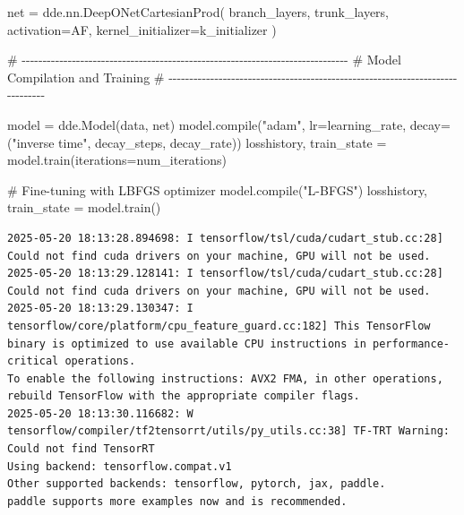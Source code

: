 \documentclass[
  spanish,
  us-letterpaper,
  DIV=11,
  numbers=noendperiod]{scrreprt}
\newenvironment{Shaded}{\begin{snugshade}}{\end{snugshade}}
\newcommand{\BuiltInTok}[1]{\textcolor[rgb]{0.00,0.23,0.31}{#1}}
\newcommand{\CommentTok}[1]{\textcolor[rgb]{0.37,0.37,0.37}{#1}}
\newcommand{\NormalTok}[1]{\textcolor[rgb]{0.00,0.23,0.31}{#1}}
\newcommand{\OperatorTok}[1]{\textcolor[rgb]{0.37,0.37,0.37}{#1}}
\newcommand{\StringTok}[1]{\textcolor[rgb]{0.13,0.47,0.30}{#1}}
\begin{document}
\begin{Shaded}
\begin{Highlighting}[]
\NormalTok{net }\OperatorTok{=}\NormalTok{ dde.nn.DeepONetCartesianProd(}
\NormalTok{    branch\_layers,}
\NormalTok{    trunk\_layers,}
\NormalTok{    activation}\OperatorTok{=}\NormalTok{AF,}
\NormalTok{    kernel\_initializer}\OperatorTok{=}\NormalTok{k\_initializer}
\NormalTok{)}

\CommentTok{\# {-}{-}{-}{-}{-}{-}{-}{-}{-}{-}{-}{-}{-}{-}{-}{-}{-}{-}{-}{-}{-}{-}{-}{-}{-}{-}{-}{-}{-}{-}{-}{-}{-}{-}{-}{-}{-}{-}{-}{-}{-}{-}{-}{-}{-}{-}{-}{-}{-}{-}{-}{-}{-}{-}{-}{-}{-}{-}{-}{-}{-}{-}{-}{-}{-}{-}{-}{-}{-}{-}{-}{-}{-}{-}{-}{-}{-}{-}}
\CommentTok{\# Model Compilation and Training}
\CommentTok{\# {-}{-}{-}{-}{-}{-}{-}{-}{-}{-}{-}{-}{-}{-}{-}{-}{-}{-}{-}{-}{-}{-}{-}{-}{-}{-}{-}{-}{-}{-}{-}{-}{-}{-}{-}{-}{-}{-}{-}{-}{-}{-}{-}{-}{-}{-}{-}{-}{-}{-}{-}{-}{-}{-}{-}{-}{-}{-}{-}{-}{-}{-}{-}{-}{-}{-}{-}{-}{-}{-}{-}{-}{-}{-}{-}{-}{-}{-}}

\NormalTok{model }\OperatorTok{=}\NormalTok{ dde.Model(data, net)}
\NormalTok{model.}\BuiltInTok{compile}\NormalTok{(}\StringTok{"adam"}\NormalTok{, lr}\OperatorTok{=}\NormalTok{learning\_rate, decay}\OperatorTok{=}\NormalTok{(}\StringTok{"inverse time"}\NormalTok{, decay\_steps, decay\_rate))}
\NormalTok{losshistory, train\_state }\OperatorTok{=}\NormalTok{ model.train(iterations}\OperatorTok{=}\NormalTok{num\_iterations)}

\CommentTok{\# Fine{-}tuning with LBFGS optimizer}
\NormalTok{model.}\BuiltInTok{compile}\NormalTok{(}\StringTok{"L{-}BFGS"}\NormalTok{)}
\NormalTok{losshistory, train\_state }\OperatorTok{=}\NormalTok{ model.train()}
\end{Highlighting}
\end{Shaded}

\begin{verbatim}
2025-05-20 18:13:28.894698: I tensorflow/tsl/cuda/cudart_stub.cc:28] Could not find cuda drivers on your machine, GPU will not be used.
2025-05-20 18:13:29.128141: I tensorflow/tsl/cuda/cudart_stub.cc:28] Could not find cuda drivers on your machine, GPU will not be used.
2025-05-20 18:13:29.130347: I tensorflow/core/platform/cpu_feature_guard.cc:182] This TensorFlow binary is optimized to use available CPU instructions in performance-critical operations.
To enable the following instructions: AVX2 FMA, in other operations, rebuild TensorFlow with the appropriate compiler flags.
2025-05-20 18:13:30.116682: W tensorflow/compiler/tf2tensorrt/utils/py_utils.cc:38] TF-TRT Warning: Could not find TensorRT
Using backend: tensorflow.compat.v1
Other supported backends: tensorflow, pytorch, jax, paddle.
paddle supports more examples now and is recommended.
\end{verbatim}
\end{document}
